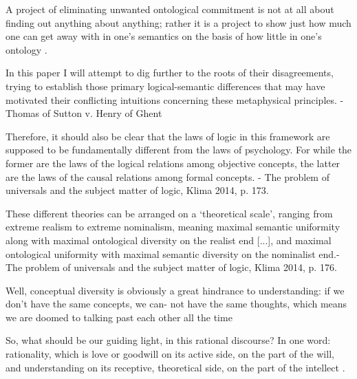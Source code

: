 \documentclass[]{article}
\begin{document}
A project of eliminating unwanted
ontological commitment is not at all about finding out anything about anything;
rather it is a project to show just how much one can get away with in one’s
semantics on the basis of how little in one’s ontology \autocite[412]{Klima2012}.

In this paper I will attempt to dig further to the roots of
their disagreements, trying to establish those primary logical-semantic differences that may have
motivated their conflicting intuitions concerning these metaphysical principles. - Thomas of Sutton v. Henry of Ghent

Therefore, it should also be clear that the laws of logic in this framework
are supposed to be fundamentally diﬀerent from the laws of psychology.
For while the former are the laws of the logical relations among objective
concepts, the latter are the laws of the causal relations among formal
concepts. - The problem of universals and the subject matter of logic, Klima 2014, p. 173.

These different theories can be arranged on a `theoretical scale', ranging from extreme realism to extreme nominalism, meaning maximal semantic uniformity along with maximal ontological diversity on the realist end [...], and maximal ontological uniformity with maximal semantic diversity on the nominalist end.- The problem of universals and the subject matter of logic, Klima 2014, p. 176.

Well, conceptual diversity is obviously
a great hindrance to understanding: if we don’t have the same concepts, we can-
not have the same thoughts, which means we are doomed to talking past each
other all the time\autocite[36]{Klima2021}

So, what should be our guiding light, in this rational discourse? In one word:
rationality, which is love or goodwill on its active side, on the part of the will, and
understanding on its receptive, theoretical side, on the part of the intellect \autocite[41]{Klima2021}.
\autocite{Parsons2014,Read2015b}

\printbibliography
\end{document}
